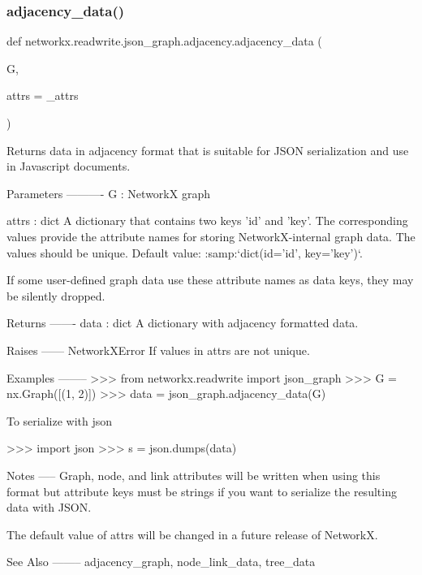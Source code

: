 \subsubsection{\texorpdfstring{adjacency\+\_\+data()}{adjacency\_data()}}
{\footnotesize\ttfamily def networkx.\+readwrite.\+json\+\_\+graph.\+adjacency.\+adjacency\+\_\+data (\begin{DoxyParamCaption}\item[{}]{G,  }\item[{}]{attrs = {\ttfamily \+\_\+attrs} }\end{DoxyParamCaption})}

\begin{DoxyVerb}Returns data in adjacency format that is suitable for JSON serialization
and use in Javascript documents.

Parameters
----------
G : NetworkX graph

attrs : dict
    A dictionary that contains two keys 'id' and 'key'. The corresponding
    values provide the attribute names for storing NetworkX-internal graph
    data. The values should be unique. Default value:
    :samp:`dict(id='id', key='key')`.

    If some user-defined graph data use these attribute names as data keys,
    they may be silently dropped.

Returns
-------
data : dict
   A dictionary with adjacency formatted data.

Raises
------
NetworkXError
    If values in attrs are not unique.

Examples
--------
>>> from networkx.readwrite import json_graph
>>> G = nx.Graph([(1, 2)])
>>> data = json_graph.adjacency_data(G)

To serialize with json

>>> import json
>>> s = json.dumps(data)

Notes
-----
Graph, node, and link attributes will be written when using this format
but attribute keys must be strings if you want to serialize the resulting
data with JSON.

The default value of attrs will be changed in a future release of NetworkX.

See Also
--------
adjacency_graph, node_link_data, tree_data
\end{DoxyVerb}
 \mbox{\label{namespacenetworkx_1_1readwrite_1_1json__graph_1_1adjacency_a039dc3a1a296edeae87c7a7b34411e18}} 
